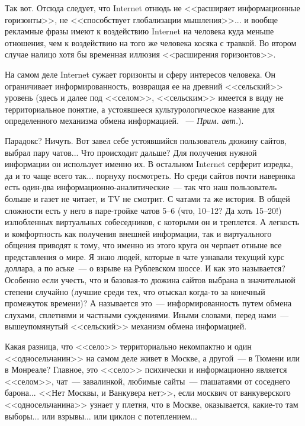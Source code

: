 \documentclass{scrbook}
\newcommand{\flqq}{<<}
\newcommand{\frqq}{>>}
\newcommand{\mdash}{~--- }
\newcommand{\ndash}{--}
\newcommand{\mycomment}[1]{{\mdash} \textit{#1}}
\begin{document}
Так вот. Отсюда следует, что Internet отнюдь не {\flqq}расширяет информационные горизонты{\frqq}, не {\flqq}способствует глобализации мышления{\frqq}... и вообще рекламные фразы имеют к воздействию Internet на человека куда меньше отношения, чем к воздействию на того же человека косяка с травкой. Во втором случае налицо хотя бы временная иллюзия {\flqq}расширения горизонтов{\frqq}.

На самом деле Internet сужает горизонты и сферу интересов человека. Он ограничивает информированность, возвращая ее на древний {\flqq}сельский{\frqq} уровень (здесь и далее под {\flqq}селом{\frqq}, {\flqq}сельским{\frqq} имеется в виду не территориальное понятие, а устоявшееся культурологическое название для определенного механизма обмена информацией. \mycomment{Прим. авт.}).

Парадокс? Ничуть. Вот завел себе устоявшийся пользователь дюжину сайтов, выбрал пару чатов... Что происходит дальше? Для получения нужной информации он использует именно их. В остальном Internet серферит изредка, да и то чаще всего так... порнуху посмотреть. Но среди сайтов почти наверняка есть один-два информационно-аналитические{\mdash}так что наш пользователь больше и газет не читает, и TV не смотрит. С чатами та же история. В общей сложности есть у него в паре-тройке чатов 5{\ndash}6 (что, 10{\ndash}12? Да хоть 15{\ndash}20!) излюбленных виртуальных собеседников, с которыми он и треплется. А легкость и комфортность как получения внешней информации, так и виртуального общения приводят к тому, что именно из этого круга он черпает отныне все представления о мире. Я знаю людей, которые в чате узнавали текущий курс доллара, а по аське{\mdash}о взрыве на Рублевском шоссе. И как это называется? Особенно если учесть, что и базовая-то дюжина сайтов выбрана в значительной степени случайно (лучшие среди тех, что отыскал когда-то за конечный промежуток времени)? А называется это{\mdash}информированность путем обмена слухами, сплетнями и частными суждениями. Иными словами, перед нами{\mdash}вышеупомянутый {\flqq}сельский{\frqq} механизм обмена информацией.

Какая разница, что {\flqq}село{\frqq} территориально некомпактно и один {\flqq}односельчанин{\frqq} на самом деле живет в Москве, а другой{\mdash}в Тюмени или в Монреале? Главное, это {\flqq}село{\frqq} психически и информационно является {\flqq}селом{\frqq}, чат{\mdash}завалинкой, любимые сайты{\mdash}глашатаями от соседнего барона... {\flqq}Нет Москвы, и Ванкувера нет{\frqq}, если москвич от ванкуверского {\flqq}односельчанина{\frqq} узнает у плетня, что в Москве, оказывается, какие-то там выборы... или взрывы... или циклон с потеплением...
\end{document}
